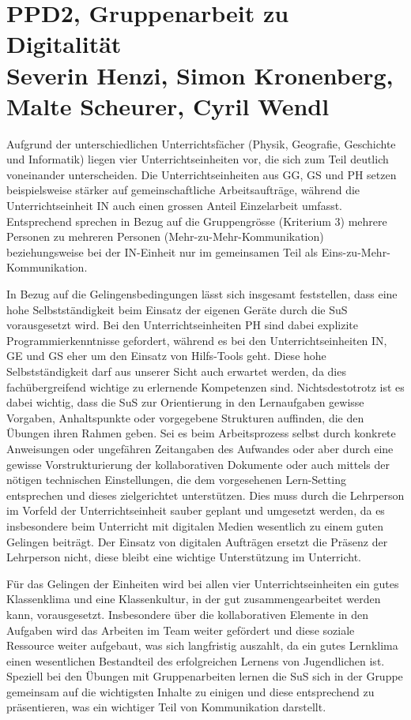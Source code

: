 \fancyfootoffset{0pt}%

\part*{PPD2, Gruppenarbeit zu Digitalität\\\normalsize
Severin Henzi, Simon Kronenberg, Malte Scheurer, Cyril Wendl}

Aufgrund der unterschiedlichen Unterrichtsfächer (Physik, Geografie, Geschichte und Informatik) liegen vier Unterrichtseinheiten vor, die sich zum Teil deutlich voneinander unterscheiden. Die Unterrichtseinheiten aus GG, GS und PH setzen beispielsweise stärker auf gemeinschaftliche Arbeitsaufträge, während die Unterrichtseinheit IN auch einen grossen Anteil Einzelarbeit umfasst. Entsprechend sprechen in Bezug auf die Gruppengrösse (Kriterium 3) mehrere Personen zu mehreren Personen (Mehr-zu-Mehr-Kommunikation) beziehungsweise bei der IN-Einheit nur im gemeinsamen Teil als Eins-zu-Mehr-Kommunikation.

In Bezug auf die Gelingensbedingungen lässt sich insgesamt feststellen, dass eine hohe Selbstständigkeit beim Einsatz der eigenen Geräte durch die SuS vorausgesetzt wird. Bei den Unterrichtseinheiten PH sind dabei explizite Programmierkenntnisse gefordert, während es bei den Unterrichtseinheiten IN, GE und GS eher um den Einsatz von Hilfs-Tools geht. Diese hohe Selbstständigkeit darf aus unserer Sicht auch erwartet werden, da dies fachübergreifend wichtige zu erlernende Kompetenzen sind. Nichtsdestotrotz ist es dabei wichtig, dass die SuS zur Orientierung in den Lernaufgaben gewisse Vorgaben, Anhaltspunkte oder vorgegebene Strukturen auffinden, die den Übungen ihren Rahmen geben. Sei es beim Arbeitsprozess selbst durch konkrete Anweisungen oder ungefähren Zeitangaben des Aufwandes oder aber durch eine gewisse Vorstrukturierung der kollaborativen Dokumente oder auch mittels der nötigen technischen Einstellungen, die dem vorgesehenen Lern-Setting entsprechen und dieses zielgerichtet unterstützen. Dies muss durch die Lehrperson im Vorfeld der Unterrichtseinheit sauber geplant und umgesetzt werden, da es insbesondere beim Unterricht mit digitalen Medien wesentlich zu einem guten Gelingen beiträgt. Der Einsatz von digitalen Aufträgen ersetzt die Präsenz der Lehrperson nicht, diese bleibt eine wichtige Unterstützung im Unterricht.

Für das Gelingen der Einheiten wird bei allen vier Unterrichtseinheiten ein gutes Klassenklima und eine Klassenkultur, in der gut zusammengearbeitet werden kann, vorausgesetzt. Insbesondere über die kollaborativen Elemente in den Aufgaben wird das Arbeiten im Team weiter gefördert und diese soziale Ressource weiter aufgebaut, was sich langfristig auszahlt, da ein gutes Lernklima einen wesentlichen Bestandteil des erfolgreichen Lernens von Jugendlichen ist. Speziell bei den Übungen mit Gruppenarbeiten lernen die SuS sich in der Gruppe gemeinsam auf die wichtigsten Inhalte zu einigen und diese entsprechend zu präsentieren, was ein wichtiger Teil von Kommunikation darstellt. 

